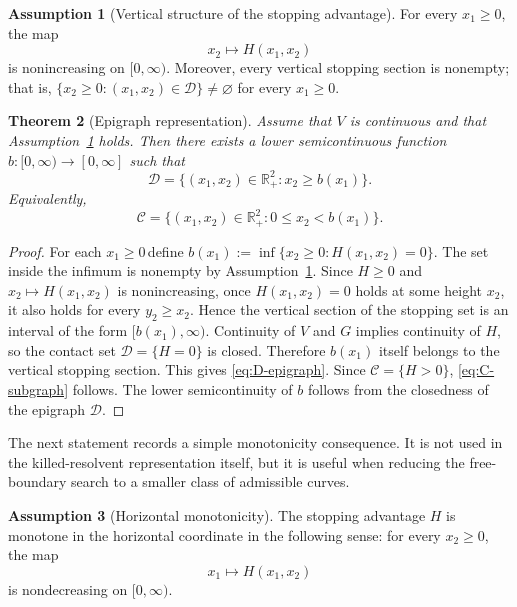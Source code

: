 \documentclass[pdflatex,sn-mathphys-num]{sn-jnl}
\theoremstyle{plain}
\newtheorem{theorem}{Theorem}[section]
\theoremstyle{definition}
\newtheorem{assumption}[theorem]{Assumption}
\theoremstyle{remark}
\numberwithin{equation}{section}
\begin{document}
\begin{assumption}[Vertical structure of the stopping advantage] \label{ass:vertical-structure} 
For every \(x_1\ge0\), the map \[ x_2\longmapsto H(x_1,x_2) \] is nonincreasing on \([0,\infty)\). Moreover, every vertical stopping section is nonempty; that is, 
$\{x_2\ge0:(x_1,x_2)\in\mathcal D\}\neq\varnothing$ for every $x_1\ge0$. 
\end{assumption} 
\begin{theorem}[Epigraph representation] \label{thm:epigraph-representation} 
Assume that \(V\) is continuous and that Assumption~\ref{ass:vertical-structure} holds. Then there exists a lower semicontinuous function 
$b:[0,\infty)\to[0,\infty]$ 
such that 
\begin{equation} \label{eq:D-epigraph} 
\mathcal D = \{(x_1,x_2)\in\mathbb R_+^2:x_2\ge b(x_1)\}. 
\end{equation} 
Equivalently, 
\begin{equation} \label{eq:C-subgraph} 
\mathcal C = \{(x_1,x_2)\in\mathbb R_+^2:0\le x_2<b(x_1)\}. 
\end{equation} 
\end{theorem} 

\begin{proof} 
For each \(x_1\ge0\)\,define 
$\displaystyle b(x_1):=\inf\{x_2\ge0:H(x_1,x_2)=0\}$. 
The set inside the infimum is nonempty by Assumption~\ref{ass:vertical-structure}. Since \(H\ge0\) and \(x_2\mapsto H(x_1,x_2)\) is nonincreasing, once \(H(x_1,x_2)=0\) holds at some height \(x_2\), it also holds for every \(y_2\ge x_2\). Hence the vertical section of the stopping set is an interval of the form 
$[b(x_1),\infty)$. 
Continuity of \(V\) and \(G\) implies continuity of \(H\), so the contact set \(\mathcal D=\{H=0\}\) is closed. Therefore \(b(x_1)\) itself belongs to the vertical stopping section. This gives \eqref{eq:D-epigraph}. Since \(\mathcal C=\{H>0\}\), \eqref{eq:C-subgraph} follows. The lower semicontinuity of \(b\) follows from the closedness of the epigraph \(\mathcal D\). 
\end{proof} 

The next statement records a simple monotonicity consequence. It is not used in the killed-resolvent representation itself, but it is useful when reducing the free-boundary search to a smaller class of admissible curves. 
\begin{assumption}[Horizontal monotonicity] \label{ass:horizontal-monotonicity} 
The stopping advantage \(H\) is monotone in the horizontal coordinate in the following sense: for every \(x_2\ge0\), the map \[ x_1\longmapsto H(x_1,x_2) \] is nondecreasing on \([0,\infty)\). 
\end{assumption} 
\end{document}
